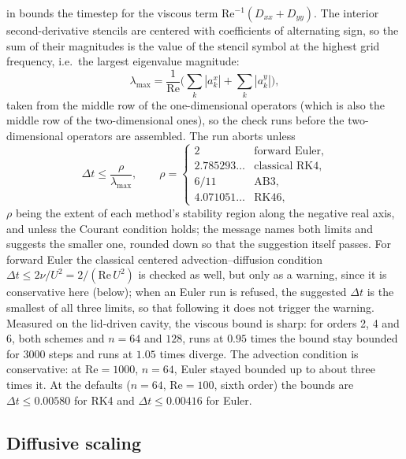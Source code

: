 \documentclass[11pt,a4paper]{article}
\newcommand{\Rey}{\mathrm{Re}}
\newcommand{\dt}{\Delta t}
\newcommand{\code}[1]{\texttt{\detokenize{#1}}}
\begin{document}
\code{max_stable_dt()} in \code{fluiddyn.c} bounds the timestep for the viscous term $\Rey^{-1}(D_{xx}+D_{yy})$.  The interior second-derivative stencils are centered with coefficients of alternating sign, so the sum of their magnitudes is the value of the stencil symbol at the highest grid frequency, i.e.\ the largest eigenvalue magnitude:
\begin{equation}
\lambda_{\max}=\frac{1}{\Rey}\Big(\sum_k |a^{x}_k| + \sum_k |a^{y}_k|\Big),
\end{equation}
taken from the middle row of the one-dimensional operators (which is also the middle row of the two-dimensional ones), so the check runs before the two-dimensional operators are assembled.  The run aborts unless
\begin{equation}
\dt\le\frac{\rho}{\lambda_{\max}},
\qquad
\rho=\begin{cases}2 & \text{forward Euler},\\ 2.785293\ldots & \text{classical RK4},\\ 6/11 & \text{AB3},\\ 4.071051\ldots & \text{RK46},\end{cases}
\end{equation}
$\rho$ being the extent of each method's stability region along the negative real axis, and unless the Courant condition holds; the message names both limits and suggests the smaller one, rounded down so that the suggestion itself passes.  For forward Euler the classical centered advection--diffusion condition $\dt\le 2\nu/U^2 = 2/(\Rey\,U^2)$ is checked as well, but only as a warning, since it is conservative here (below); when an Euler run is refused, the suggested $\dt$ is the smallest of all three limits, so that following it does not trigger the warning.  Measured on the lid-driven cavity, the viscous bound is sharp: for orders 2, 4 and 6, both schemes and $n=64$ and $128$, runs at $0.95$ times the bound stay bounded for 3000 steps and runs at $1.05$ times diverge.  The advection condition is conservative: at $\Rey=1000$, $n=64$, Euler stayed bounded up to about three times it.  At the defaults ($n=64$, $\Rey=100$, sixth order) the bounds are $\dt\le 0.00580$ for RK4 and $\dt\le 0.00416$ for Euler.

\subsection{Diffusive scaling}
\end{document}
